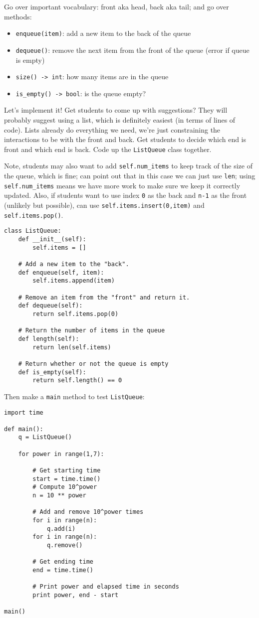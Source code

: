 \documentclass{article}
\begin{document}
Go over important vocabulary: front aka head, back aka tail; and go
over methods:
\begin{itemize}
\item \verb|enqueue(item)|: add a new item to the back of the queue
\item \verb|dequeue()|: remove the next item from the front of the
  queue (error if queue is empty)
\item \verb|size() -> int|: how many items are in the queue
\item \verb|is_empty() -> bool|: is the queue empty?
\end{itemize}

Let's implement it!  Get students to come up with suggestions?  They
will probably suggest using a list, which is definitely easiest (in
terms of lines of code). Lists already do everything we need, we're
just constraining the interactions to be with the front and back. Get
students to decide which end is front and which end is back.  Code up
the \verb|ListQueue| class together.

Note, students may also want to add \verb|self.num_items| to keep
track of the size of the queue, which is fine; can point out that in
this case we can just use \verb|len|; using \verb|self.num_items|
means we have more work to make sure we keep it correctly updated.
Also, if students want to use index \verb|0| as the back and
\verb|n-1| as the front (unlikely but possible), can use
\verb|self.items.insert(0,item)| and \verb|self.items.pop()|.
\begin{verbatim}
class ListQueue:
    def __init__(self):
        self.items = []

    # Add a new item to the "back".
    def enqueue(self, item):
        self.items.append(item)

    # Remove an item from the "front" and return it.
    def dequeue(self):
        return self.items.pop(0)

    # Return the number of items in the queue
    def length(self):
        return len(self.items)

    # Return whether or not the queue is empty
    def is_empty(self):
        return self.length() == 0
\end{verbatim}

Then make a \verb|main| method to test \verb|ListQueue|:

\begin{verbatim}
import time

def main():
    q = ListQueue()

    for power in range(1,7):

        # Get starting time
        start = time.time()
        # Compute 10^power
        n = 10 ** power

        # Add and remove 10^power times
        for i in range(n):
            q.add(i)
        for i in range(n):
            q.remove()

        # Get ending time
        end = time.time()

        # Print power and elapsed time in seconds
        print power, end - start

main()
\end{verbatim}
\end{document}
